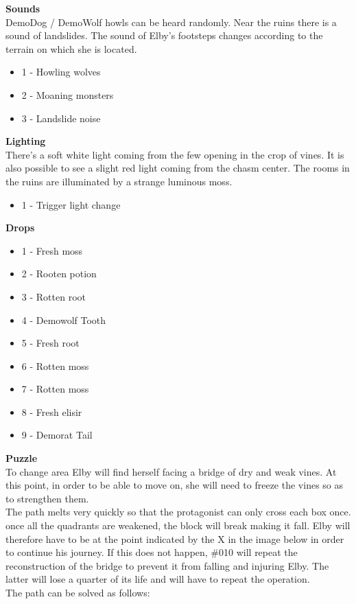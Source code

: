 \newpage

\textbf{Sounds}\\
DemoDog / DemoWolf howls can be heard randomly. Near the ruins there is a sound of landslides. The sound of Elby's footsteps changes according to the terrain on which she is located.

\begin{itemize}
	\item 1 - Howling wolves
	\item 2 - Moaning monsters
	\item 3 - Landslide noise
\end{itemize}

\textbf{Lighting}\\
There's a soft white light coming from the few opening in the crop of vines. It is also possible to see a slight red light coming from the chasm center. The rooms in the ruins are illuminated by a strange luminous moss.

\begin{itemize}
	\item 1 - Trigger light change
\end{itemize}

\textbf{Drops}
\begin{itemize}
	\item 1 - Fresh moss
	\item 2 - Rooten potion
	\item 3 - Rotten root
	\item 4 - Demowolf Tooth
	\item 5 - Fresh root
	\item 6 - Rotten moss
	\item 7 - Rotten moss
	\item 8 - Fresh elisir
	\item 9 - Demorat Tail
\end{itemize}

\textbf{Puzzle}\\
To change area Elby will find herself facing a bridge of dry and weak vines. At this point, in order to be able to move on, she will need to freeze the vines so as to strengthen them.\\
The path melts very quickly so that the protagonist can only cross each box once. once all the quadrants are weakened, the block will break making it fall. Elby will therefore have to be at the point indicated by the X in the image below in order to continue his journey. If this does not happen, \#010 will repeat the reconstruction of the bridge to prevent it from falling and injuring Elby. The latter will lose a quarter of its life and will have to repeat the operation.\\
The path can be solved as follows:\\

